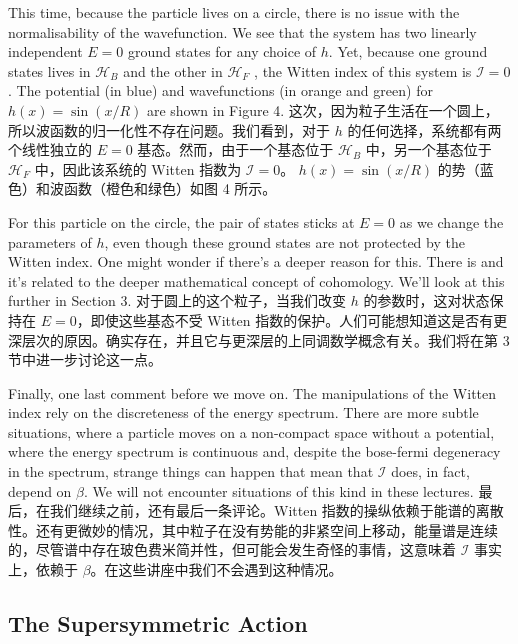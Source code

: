 \documentclass{ctexart}
\begin{document}
\begin{paracol}{2}
This time, because the particle lives on a circle, there is no issue with the normalisability of the wavefunction. We see that the system has two linearly independent $E = 0$ ground states for any choice of $h$. Yet, because one ground states lives in $\mathcal{H}_B$ and the other in $\mathcal{H}_F$ , the Witten index of this system is $\mathcal{I} = 0$. The potential (in blue) and wavefunctions (in orange and green) for $h(x) = \sin(x / R)$ are shown in Figure 4.
\switchcolumn
这次，因为粒子生活在一个圆上，所以波函数的归一化性不存在问题。我们看到，对于 $h$ 的任何选择，系统都有两个线性独立的 $E = 0$ 基态。然而，由于一个基态位于 $\mathcal{H}_B$ 中，另一个基态位于 $\mathcal{H}_F$ 中，因此该系统的 Witten 指数为 $\mathcal{I} = 0$。 $h(x) = \sin(x / R)$ 的势（蓝色）和波函数（橙色和绿色）如图 4 所示。
\switchcolumn*

For this particle on the circle, the pair of states sticks at $E = 0$ as we change the parameters of $h$, even though these ground states are not protected by the Witten index. One might wonder if there's a deeper reason for this. There is and it's related to the deeper mathematical concept of cohomology. We'll look at this further in Section 3.
\switchcolumn
对于圆上的这个粒子，当我们改变 $h$ 的参数时，这对状态保持在 $E = 0$，即使这些基态不受 Witten 指数的保护。人们可能想知道这是否有更深层次的原因。确实存在，并且它与更深层的上同调数学概念有关。我们将在第 3 节中进一步讨论这一点。
\switchcolumn*

Finally, one last comment before we move on. The manipulations of the Witten index rely on the discreteness of the energy spectrum. There are more subtle situations, where a particle moves on a non-compact space without a potential, where the energy spectrum is continuous and, despite the bose-fermi degeneracy in the spectrum, strange things can happen that mean that $\mathcal{I}$ does, in fact, depend on $\beta$. We will not encounter situations of this kind in these lectures.
\switchcolumn
最后，在我们继续之前，还有最后一条评论。Witten 指数的操纵依赖于能谱的离散性。还有更微妙的情况，其中粒子在没有势能的非紧空间上移动，能量谱是连续的，尽管谱中存在玻色费米简并性，但可能会发生奇怪的事情，这意味着 $\mathcal{I}$ 事实上，依赖于 $\beta$。在这些讲座中我们不会遇到这种情况。
\switchcolumn*

\subsection{The Supersymmetric Action}
\switchcolumn

\end{paracol}
\end{document}
